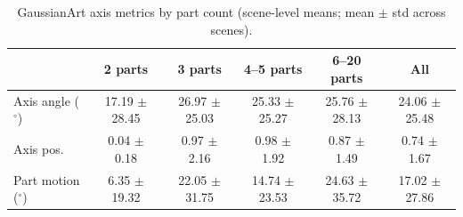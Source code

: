 \begin{table}[t]
\centering
\small
\begin{tabular}{lccccc}
\toprule
 & 2 parts & 3 parts & 4--5 parts & 6--20 parts & All \\
\midrule
Axis angle ($^\circ$) & 17.19 $\pm$ 28.45 & 26.97 $\pm$ 25.03 & 25.33 $\pm$ 25.27 & 25.76 $\pm$ 28.13 & 24.06 $\pm$ 25.48 \\
Axis pos. & 0.04 $\pm$ 0.18 & 0.97 $\pm$ 2.16 & 0.98 $\pm$ 1.92 & 0.87 $\pm$ 1.49 & 0.74 $\pm$ 1.67 \\
Part motion ($^\circ$) & 6.35 $\pm$ 19.32 & 22.05 $\pm$ 31.75 & 14.74 $\pm$ 23.53 & 24.63 $\pm$ 35.72 & 17.02 $\pm$ 27.86 \\
\bottomrule
\end{tabular}
\caption{GaussianArt axis metrics by part count (scene-level means; mean $\pm$ std across scenes).}
\label{tab:mpart-axis-metrics}
\end{table}
